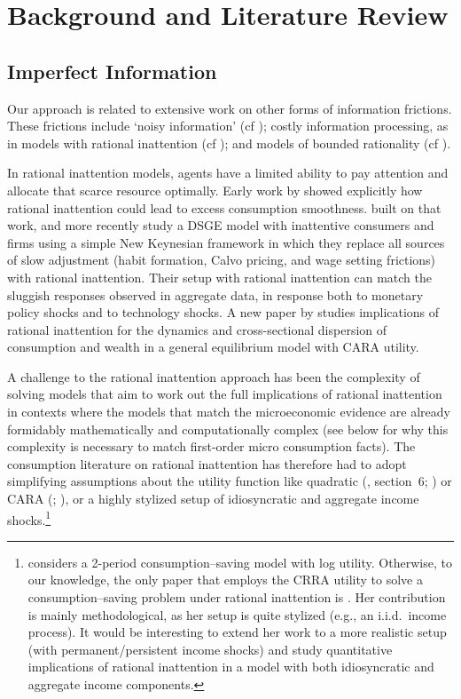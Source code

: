 \hypertarget{Literature}{}
\section{Background and Literature Review}\label{sec:relation}

\hypertarget{Imperfect-Information}{}
\subsection{Imperfect Information}
Our approach is related to extensive work on other forms of information frictions. These frictions include `noisy information' (cf \cite{pischkeMicroMacro}); costly information processing, as in models with rational inattention (cf \cite{simsInattention}); and models of bounded rationality (cf \cite{gabaixSparsityQJE}).

In rational inattention models, agents have a limited ability to pay attention and allocate that scarce resource optimally. Early work by \cite{reis:inattentive} showed explicitly how rational inattention could lead to excess consumption smoothness.
\cite{mw09:RI} built on that work, and more recently \cite{mackWiedREStud15} study a DSGE model with inattentive consumers and firms using a simple New Keynesian framework in which they replace all sources of slow adjustment (habit formation, Calvo pricing, and wage setting frictions) with rational inattention.  Their setup with rational inattention can match the sluggish responses observed in aggregate data, in response both to monetary policy shocks and to technology shocks. A new paper by \cite{LuoRinGE} studies implications of rational inattention for the dynamics and cross-sectional dispersion of consumption and wealth in a general equilibrium model with CARA utility.

A challenge to the rational inattention approach has been the complexity of solving models that aim to work out the full implications of rational inattention in contexts where the models that match the microeconomic evidence are already formidably mathematically and computationally complex (see below for why this complexity is necessary to match first-order micro consumption facts).  The consumption literature on rational inattention has therefore had to adopt simplifying assumptions about the utility function like quadratic (\cite{simsInattention}, section~6; \cite{luo:inatC}) or CARA (\cite{LuoRinGE}; \cite{reis:inattentive}), or a highly stylized setup of idiosyncratic and aggregate income shocks.\footnote{\cite{sims_beyondLQ} considers a 2-period consumption--saving model with log utility. Otherwise, to our knowledge, the only paper that employs the CRRA utility to solve a consumption--saving problem under rational inattention is \cite{tutino_RIconsumption}. Her contribution is mainly methodological, as her setup is quite stylized (e.g., an i.i.d.\ income process).  It would be interesting to extend her work to a more realistic setup (with permanent/persistent income shocks) and study quantitative implications of rational inattention in a model with both idiosyncratic and aggregate income components.}


